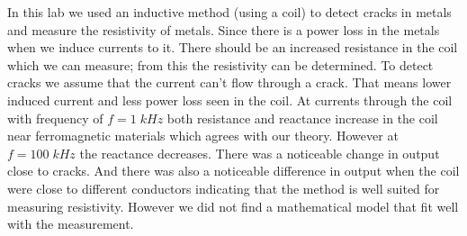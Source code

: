 In this lab we used an inductive method (using a coil) to detect cracks in metals and measure the resistivity of metals.
Since there is a power loss in the metals when we induce currents to it. There should be an increased resistance in the coil which we can measure; from this the resistivity can be determined.
To detect cracks we assume that the current can't flow through a crack. That means lower induced current and less power loss seen in the coil.
At currents through the
coil with frequency of $f=1\;kHz$ both resistance and reactance increase in the coil near ferromagnetic materials which agrees with our theory. However at $f=100\;kHz$ the reactance decreases.
There was a noticeable change in output close to cracks. And there was also a noticeable difference in
output when the coil were close to different conductors indicating that the method is well suited for measuring resistivity. However we did not find a mathematical model that fit well with the measurement.
